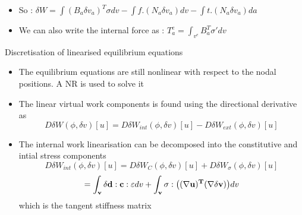  	\begin{frame}
 		\begin{itemize}
 			\item So : $\delta W = \int (B_a \delta v_a)^T \sigma dv - \int f.(N_a \delta v_a) dv - \int t.(N_a \delta v_a) da$ 
 			\item We can also write the internal force as : $T_a^e = \int_{v^e} B^T_a \sigma' dv$
 			
 		\end{itemize} 
 	\end{frame}
 
 
 	\begin{frame}{Discretisation of linearised equilibrium equations}
 		\begin{itemize}
 			\item The equilibrium equations are still nonlinear with respect to the nodal positions. A NR is used to solve it
 			\item The linear virtual work components is found using the directional derivative as 
 			\begin{equation}
 			D\delta W(\phi,\delta v)[u] = D \delta W_{int}(\phi,\delta v)[u] - D \delta W_{ext}(\phi,\delta v)[u]
 			\end{equation}
 			\item The internal work linearisation can be decomposed into the constitutive and intial stress components
 			\begin{equation}
 			D \delta W_{int}(\phi,\delta v)[u] =D \delta W_{C}(\phi,\delta v)[u] +D \delta W_{\sigma}(\phi,\delta v)[u] 
 			\end{equation}
 			\begin{equation}
 			 = \mathbf{\int_v \delta d:c:\varepsilon} dv + \mathbf{\int_v \sigma : \left((\nabla u)^T(\nabla \delta v) \right)} dv
 			\end{equation}
 			which is the tangent stiffness matrix
 			\end{itemize}
 	\end{frame}
 
